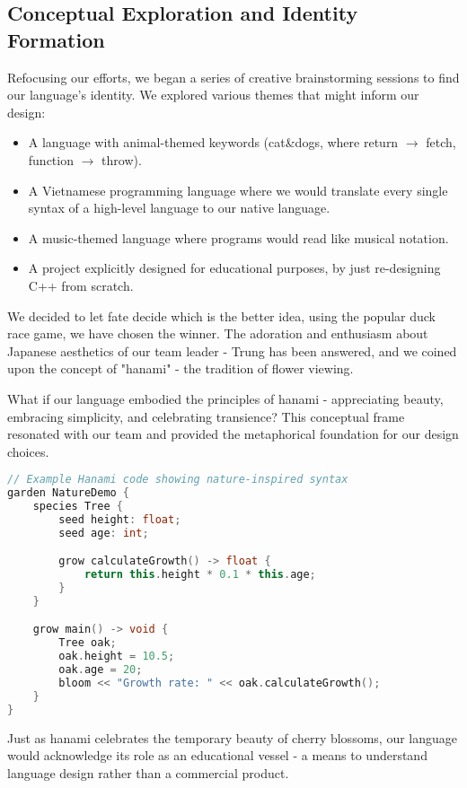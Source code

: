\documentclass[conference]{IEEEtran}
\begin{document}
\subsection{Conceptual Exploration and Identity Formation}
Refocusing our efforts, we began a series of creative brainstorming sessions to find our language's identity. We explored various themes that might inform our design:
\begin{itemize}
    \item A language with animal-themed keywords (cat\&dogs, where return $\rightarrow$ fetch, function $\rightarrow$ throw).
    \item A Vietnamese programming language where we would translate every single syntax of a high-level language to our native language.
    \item A music-themed language where programs would read like musical notation.
    \item A project explicitly designed for educational purposes, by just re-designing C++ from scratch.
\end{itemize}
We decided to let fate decide which is the better idea, using the popular duck race game, we have chosen the winner. The adoration and enthusiasm about Japanese aesthetics of our team leader - Trung has been answered, and we coined upon the concept of "hanami" - the tradition of flower viewing.

What if our language embodied the principles of hanami - appreciating beauty, embracing simplicity, and celebrating transience? This conceptual frame resonated with our team and provided the metaphorical foundation for our design choices.

\begin{lstlisting}[language=C++, caption={Example Hanami code showing nature-inspired syntax}, label={lst:nature_demo}]
// Example Hanami code showing nature-inspired syntax
garden NatureDemo {
    species Tree {
        seed height: float;
        seed age: int;

        grow calculateGrowth() -> float {
            return this.height * 0.1 * this.age;
        }
    }

    grow main() -> void {
        Tree oak;
        oak.height = 10.5;
        oak.age = 20;
        bloom << "Growth rate: " << oak.calculateGrowth();
    }
}
\end{lstlisting}
Just as hanami celebrates the temporary beauty of cherry blossoms, our language would acknowledge its role as an educational vessel - a means to understand language design rather than a commercial product.
\end{document}
